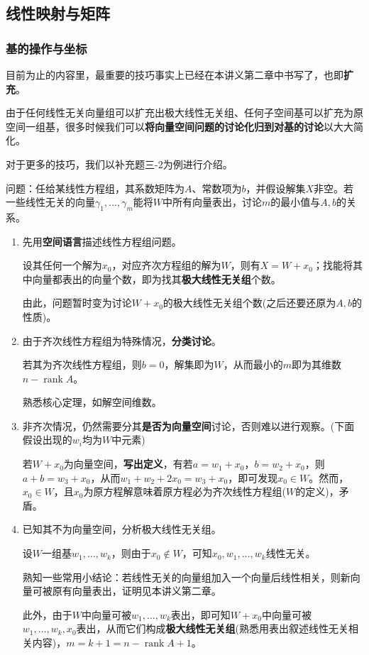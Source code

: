 \documentclass[a4paper,UTF8,fontset=windows]{ctexart}
\DeclareMathOperator{\rank}{rank}
\newcommand*{\note}{\noindent *}
\begin{document}
\subsection{线性映射与矩阵}
\subsubsection{基的操作与坐标}
目前为止的内容里，最重要的技巧事实上已经在本讲义第二章中书写了，也即\textbf{扩充}。

由于任何线性无关向量组可以扩充出极大线性无关组、任何子空间基可以扩充为原空间一组基，很多时候我们可以\textbf{将向量空间问题的讨论化归到对基的讨论}以大大简化。

对于更多的技巧，我们以补充题三-2为例进行介绍。

问题：任给某线性方程组，其系数矩阵为$A$、常数项为$b$，并假设解集$X$非空。若一些线性无关的向量$\gamma_1,\dots,\gamma_m$能将$W$中所有向量表出，讨论$m$的最小值与$A,b$的关系。

\begin{enumerate}
    \item 先用\textbf{空间语言}描述线性方程组问题。
    
    设其任何一个解为$x_0$，对应齐次方程组的解为$W$，则有$X=W+x_0$；找能将其中向量都表出的向量个数，即为找其\textbf{极大线性无关组}个数。
    
    由此，问题暂时变为讨论$W+x_0$的极大线性无关组个数(之后还要还原为$A,b$的性质)。

    \item 由于齐次线性方程组为特殊情况，\textbf{分类讨论}。
    
    若其为齐次线性方程组，则$b=0$，解集即为$W$，从而最小的$m$即为其维数$n-\rank A$。
    
    \note 熟悉核心定理，如解空间维数。
    
    \item 非齐次情况，仍然需要分其\textbf{是否为向量空间}讨论，否则难以进行观察。(下面假设出现的$w_i$均为$W$中元素)
    
    若$W+x_0$为向量空间，\textbf{写出定义}，有若$a=w_1+x_0$，$b=w_2+x_0$，则$a+b=w_3+x_0$，从而$w_1+w_2+2x_0=w_3+x_0$，即可发现$x_0\in W$。然而，$x_0\in W$，且$x_0$为原方程解意味着原方程必为齐次线性方程组($W$的定义)，矛盾。

    \item 已知其不为向量空间，分析极大线性无关组。
    
    设$W$一组基$w_1,\dots,w_k$，则由于$x_0\notin W$，可知$x_0,w_1,\dots,w_k$线性无关。
    
    \note 熟知一些常用小结论：若线性无关的向量组加入一个向量后线性相关，则新向量可被原有向量表出，证明见本讲义第二章。

    此外，由于$W$中向量可被$w_1,\dots,w_k$表出，即可知$W+x_0$中向量可被$w_1,\dots,w_k,x_0$表出，从而它们构成\textbf{极大线性无关组}(熟悉用表出叙述线性无关相关内容)，$m=k+1=n-\rank A+1$。
\end{enumerate}
\end{document}
